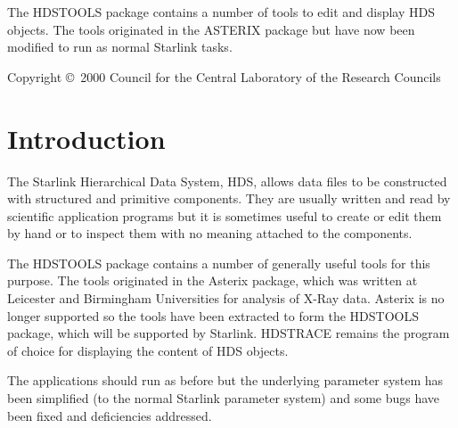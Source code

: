 \documentclass[twoside,11pt]{article}
\newcommand{\stardocinitials}  {SUN}
\newcommand{\stardoccopyright}
{Copyright \copyright\ 2000 Council for the Central Laboratory of the Research Councils}
\newcommand{\stardocnumber}    {245.0}
\newcommand{\stardocabstract}  {The HDSTOOLS package contains a number of tools
to edit and display HDS objects. The tools originated in the ASTERIX package
but have now been modified to run as normal Starlink tasks.}
\newcommand{\stardocname}{\stardocinitials /\stardocnumber}
\newenvironment{latexonly}{}{}
\newcommand{\xref}[3]{#1}
\renewcommand{\_}{\texttt{\symbol{95}}}
\renewcommand{\thepage}{\roman{page}}
\begin{document}
\stardocabstract

\begin{latexonly}
\newpage
\vspace*{\fill}
\stardoccopyright
\end{latexonly}

  \newpage
  \begin{latexonly}
    \setlength{\parskip}{0mm}
    \tableofcontents
    \setlength{\parskip}{\medskipamount}
    \markboth{\stardocname}{\stardocname}
  \end{latexonly}

\cleardoublepage
\renewcommand{\thepage}{\arabic{page}}
\setcounter{page}{1}

\section{Introduction}
The Starlink Hierarchical Data System,
\xref{HDS}{sun92}{},
allows data files to be constructed with structured and primitive components.
They are usually written and read by scientific application programs but it is
sometimes useful to create or edit them by hand or to inspect them with no
meaning attached to the components.

The HDSTOOLS package contains a number of generally useful tools for this
purpose. The tools originated in the Asterix package, which was written at
Leicester and Birmingham Universities for analysis of X-Ray data.
Asterix is no longer supported so the tools have been extracted to form the
HDSTOOLS package, which will be supported by Starlink.
\xref{HDSTRACE}{sun102}{} remains the program of choice for displaying the
content of HDS objects.

The applications should run as before but the underlying parameter system has
been simplified (to the normal Starlink parameter system) and some bugs have
been fixed and deficiencies addressed.
\end{document}
